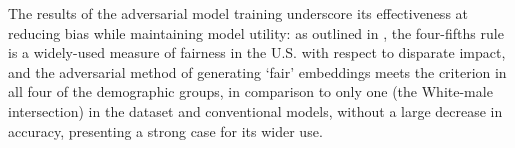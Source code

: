 \documentclass[conference]{IEEEtran}
\begin{document}
The results of the adversarial model training underscore its effectiveness at reducing bias while maintaining model utility: as outlined in \cite{feldman2015certifying}, the four-fifths rule is a widely-used measure of fairness in the U.S. with respect to disparate impact, and the adversarial method of generating `fair' embeddings meets the criterion in all four of the demographic groups, in comparison to only one (the White-male intersection) in the dataset and conventional models, without a large decrease in accuracy, presenting a strong case for its wider use.



\end{document}
